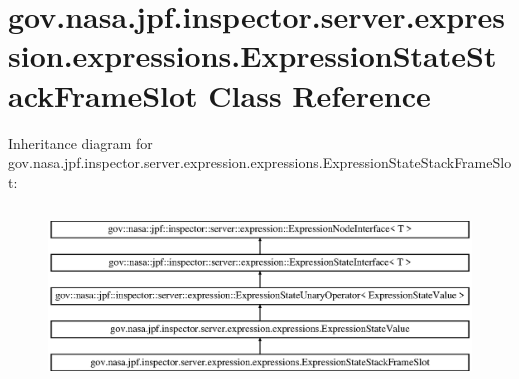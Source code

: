 \hypertarget{classgov_1_1nasa_1_1jpf_1_1inspector_1_1server_1_1expression_1_1expressions_1_1_expression_state_stack_frame_slot}{}\section{gov.\+nasa.\+jpf.\+inspector.\+server.\+expression.\+expressions.\+Expression\+State\+Stack\+Frame\+Slot Class Reference}
\label{classgov_1_1nasa_1_1jpf_1_1inspector_1_1server_1_1expression_1_1expressions_1_1_expression_state_stack_frame_slot}
Inheritance diagram for gov.\+nasa.\+jpf.\+inspector.\+server.\+expression.\+expressions.\+Expression\+State\+Stack\+Frame\+Slot\+:\begin{figure}[H]
\begin{center}
\leavevmode
\includegraphics[height=4.745763cm]{classgov_1_1nasa_1_1jpf_1_1inspector_1_1server_1_1expression_1_1expressions_1_1_expression_state_stack_frame_slot}
\end{center}
\end{figure}
